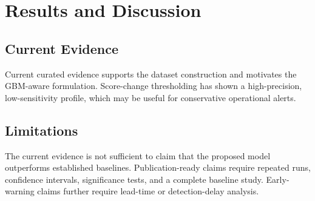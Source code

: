 \section{Results and Discussion}

\subsection{Current Evidence}

Current curated evidence supports the dataset construction and motivates the GBM-aware formulation. Score-change thresholding has shown a high-precision, low-sensitivity profile, which may be useful for conservative operational alerts.

\subsection{Limitations}

The current evidence is not sufficient to claim that the proposed model outperforms established baselines. Publication-ready claims require repeated runs, confidence intervals, significance tests, and a complete baseline study. Early-warning claims further require lead-time or detection-delay analysis.

